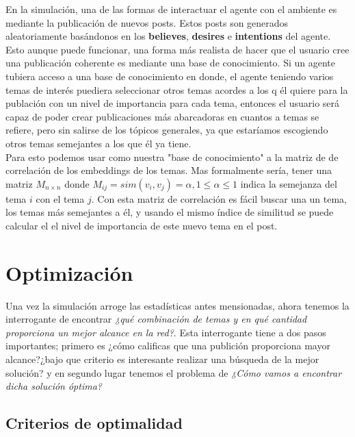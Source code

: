 \documentclass[12pt]{article}
\begin{document}
En la simulación, una de las formas de interactuar el agente con el ambiente es mediante la publicación de nuevos posts. Estos posts son generados aleatoriamente basándonos en los \textbf{believes}, \textbf{desires} e \textbf{intentions} del agente. Esto aunque puede funcionar, una forma más realista de hacer que el usuario
cree una publicación coherente es mediante una base de conocimiento. Si un agente tubiera acceso a una base de conocimiento en donde, el agente teniendo varios temas de interés puediera seleccionar otros temas acordes a los q él quiere para la publación con un nivel de importancia para cada tema, entonces el usuario será capaz 
de poder crear publicaciones más abarcadoras en cuantos a temas se refiere, pero sin salirse de los tópicos generales, ya que estaríamos escogiendo otros temas semejantes a los que él ya tiene.
\\
Para esto podemos usar como nuestra "base de conocimiento" a la matriz de de correlación de los embeddings de los temas. Mas formalmente sería, tener una matriz $M_{n \times n}$ donde $M_{ij} = sim(v_i, v_j) = \alpha, 1 \leq \alpha \leq 1$ indica la semejanza del tema $i$ con el tema $j$. Con esta matriz de correlación es fácil buscar
una un tema, los temas más semejantes a él, y usando el mismo índice de similitud se puede calcular el el nivel de importancia de este nuevo tema en el post.


\section{Optimización}

Una vez la simulación arroge las estadísticas antes mensionadas, ahora tenemos la interrogante de encontrar \textit{¿qué combinación de temas y en qué cantidad proporciona un mejor alcance en la red?}.
Esta interrogante tiene a dos pasos importantes; primero es ¿cómo calificas que una publición proporciona mayor alcance?¿bajo que criterio es interesante realizar una búsqueda de la mejor solución? y
en segundo lugar tenemos el problema de \textit{¿Cómo vamos a encontrar dicha solución óptima?}

\subsection{Criterios de optimalidad}
\end{document}
